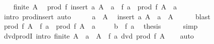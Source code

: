 \begin{isabellebody}
\ \ \isamarkupfalse%
\ {\isacartoucheopen}finite\ A{\isacartoucheclose}\ \isamarkupfalse%
\ {\isachardoublequoteopen}prod\ f\ {\isacharparenleft}{\kern0pt}insert\ a\ {\isacharparenleft}{\kern0pt}A\ {\isacharminus}{\kern0pt}\ {\isacharbraceleft}{\kern0pt}a{\isacharbraceright}{\kern0pt}{\isacharparenright}{\kern0pt}{\isacharparenright}{\kern0pt}\ {\isacharequal}{\kern0pt}\ f\ a\ {\isacharasterisk}{\kern0pt}\ prod\ f\ {\isacharparenleft}{\kern0pt}A\ {\isacharminus}{\kern0pt}\ {\isacharbraceleft}{\kern0pt}a{\isacharbraceright}{\kern0pt}{\isacharparenright}{\kern0pt}{\isachardoublequoteclose}\isanewline
\ \ \ \ \isamarkupfalse%
\ {\isacharparenleft}{\kern0pt}intro\ prod{\isachardot}{\kern0pt}insert{\isacharparenright}{\kern0pt}\ auto\isanewline
\ \ \isamarkupfalse%
\ \isamarkupfalse%
\ {\isacartoucheopen}a\ {\isasymin}\ A{\isacartoucheclose}\ \isamarkupfalse%
\ {\isachardoublequoteopen}insert\ a\ {\isacharparenleft}{\kern0pt}A\ {\isacharminus}{\kern0pt}\ {\isacharbraceleft}{\kern0pt}a{\isacharbraceright}{\kern0pt}{\isacharparenright}{\kern0pt}\ {\isacharequal}{\kern0pt}\ A{\isachardoublequoteclose}\isanewline
\ \ \ \ \isamarkupfalse%
\ blast\isanewline
\ \ \isamarkupfalse%
\ \isamarkupfalse%
\ {\isachardoublequoteopen}prod\ f\ A\ {\isacharequal}{\kern0pt}\ f\ a\ {\isacharasterisk}{\kern0pt}\ prod\ f\ {\isacharparenleft}{\kern0pt}A\ {\isacharminus}{\kern0pt}\ {\isacharbraceleft}{\kern0pt}a{\isacharbraceright}{\kern0pt}{\isacharparenright}{\kern0pt}{\isachardoublequoteclose}\ \isacommand{{\isachardot}{\kern0pt}}\isamarkupfalse%
\isanewline
\ \ \isamarkupfalse%
\ {\isacartoucheopen}b\ {\isacharequal}{\kern0pt}\ f\ a{\isacartoucheclose}\ \isamarkupfalse%
\ {\isacharquery}{\kern0pt}thesis\isanewline
\ \ \ \ \isamarkupfalse%
\ simp\isanewline
{}\isamarkupfalse%
%
\endisatagproof
{\isafoldproof}%
%
\isadelimproof
\isanewline
%
\endisadelimproof
\isanewline
{}\isamarkupfalse%
\ dvd{\isacharunderscore}{\kern0pt}prodI\ {\isacharbrackleft}{\kern0pt}intro{\isacharbrackright}{\kern0pt}{\isacharcolon}{\kern0pt}\ {\isachardoublequoteopen}finite\ A\ {\isasymLongrightarrow}\ a\ {\isasymin}\ A\ {\isasymLongrightarrow}\ f\ a\ dvd\ prod\ f\ A{\isachardoublequoteclose}\isanewline
%
\isadelimproof
\ \ %
\endisadelimproof
%
\isatagproof
{}\isamarkupfalse%
\ auto%
\endisatagproof
{\isafoldproof}%
%
\isadelimproof
\isanewline
%
\endisadelimproof

\end{isabellebody}

